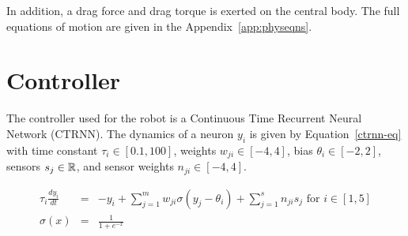 In addition, a drag force and drag torque is exerted on the central
body.  The full equations of motion are given in the
Appendix~\ref{app:physeqns}.

\section{Controller}

The controller used for the robot is a Continuous Time Recurrent
Neural Network (CTRNN).  The dynamics of a neuron $y_i$ is given by
Equation~\ref{ctrnn-eq} with time constant $\tau_i \in [0.1, 100]$,
weights $w_{ji} \in [-4, 4]$, bias $\theta_i \in [-2, 2]$, sensors
$s_j \in \mathbb{R} $, and sensor weights $n_{ji} \in [-4, 4]$.

\begin{eqnarray}
  \tau_i \frac{d y_i}{dt} &=& -y_i + \sum_{j = 1}^m w_{ji} \sigma(y_j - \theta_i) + \sum_{j=1}^s n_{ji} s_j \text{ for } i \in [1,5] \label{ctrnn-eq} \\
  \sigma(x) &=& \frac{1}{1 + e^{-x}}
\end{eqnarray}

